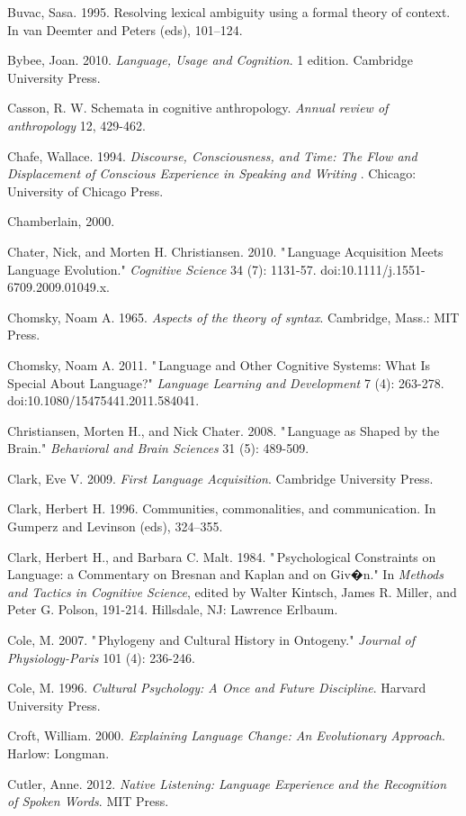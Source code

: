 Buvac, Sasa. 1995. Resolving lexical ambiguity using a formal theory of 
context. In van Deemter and Peters (eds), 101--124.

Bybee, Joan. 2010. \textit{Language, Usage and Cognition}. 1 edition. 
Cambridge University Press.

Casson, R. W. Schemata in cognitive anthropology. \textit{Annual review 
of anthropology} 12, 429-462.

Chafe, Wallace. 1994. \textit{Discourse, Consciousness, and Time: The 
Flow and Displacement of Conscious Experience in Speaking and Writing}
. Chicago: University of Chicago Press.

Chamberlain, 2000.

Chater, Nick, and Morten H. Christiansen. 2010. "\,Language Acquisition 
Meets Language Evolution." \textit{Cognitive Science} 34 (7): 1131-57. 
doi:10.1111/j.1551-6709.2009.01049.x.

Chomsky, Noam A. 1965. \textit{Aspects of the theory of syntax}. 
Cambridge, Mass.: MIT Press.

Chomsky, Noam A. 2011. "\,Language and Other Cognitive Systems: What Is 
Special About Language?" \textit{Language Learning and Development} 7 
(4): 263-278. doi:10.1080/15475441.2011.584041.

Christiansen, Morten H., and Nick Chater. 2008. "\,Language as Shaped by 
the Brain." \textit{Behavioral and Brain Sciences} 31 (5): 489-509.

Clark, Eve V. 2009. \textit{First Language Acquisition}. Cambridge 
University Press.

Clark, Herbert H. 1996. Communities, commonalities, and communication. 
In Gumperz and Levinson (eds), 324--355.

Clark, Herbert H., and Barbara C. Malt. 1984. "\,Psychological 
Constraints on Language: a Commentary on Bresnan and Kaplan and on 
Giv�n." In \textit{Methods and Tactics in Cognitive Science}, edited 
by Walter Kintsch, James R. Miller, and Peter G. Polson, 191-214. 
Hillsdale, NJ: Lawrence Erlbaum.

Cole, M. 2007. "\,Phylogeny and Cultural History in Ontogeny." \textit{
Journal of Physiology-Paris} 101 (4): 236-246.

Cole, M. 1996. \textit{Cultural Psychology: A Once and Future 
Discipline}. Harvard University Press.

Croft, William. 2000. \textit{Explaining Language Change: An 
Evolutionary Approach}. Harlow: Longman.

Cutler, Anne. 2012. \textit{Native Listening: Language Experience and 
the Recognition of Spoken Words}. MIT Press.

